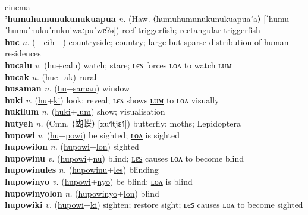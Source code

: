 cinema \label{humocakilyot} \\
\textbf{'humuhumunukunukuapua} \textit{n.} (Haw. ⟨humuhumunukunukuapuaʻa⟩ [ˈhumuˈhumuˈnukuˈnukuˈwaːpuˈwɐʔə])
reef triggerfish; rectangular triggerfish \label{'humuhumunukunukuapua} \\
\textbf{huc} \textit{n.} (\hyperref[cih]{~~cih~~})
countryside; country; large but sparse distribution of human residences \label{huc} \\
\textbf{hucalu} \textit{v.} (\hyperref[hu]{hu}+\hyperref[calu]{calu})
watch; stare; ʟєꜱ forces ʟᴏᴧ to watch ʟᴜᴍ \label{hucalu} \\
\textbf{hucak} \textit{n.} (\hyperref[huc]{huc}+\hyperref[ak]{ak})
rural \label{hucak} \\
\textbf{husaman} \textit{n.} (\hyperref[hu]{hu}+\hyperref[saman]{saman})
window \label{husaman} \\
\textbf{huki} \textit{v.} (\hyperref[hu]{hu}+\hyperref[ki]{ki})
look; reveal; ʟєꜱ shows \hyperref[hukilum]{ʟᴜᴍ} to ʟᴏᴧ visually \label{huki} \\
\textbf{hukilum} \textit{n.} (\hyperref[huki]{huki}+\hyperref[lum]{lum})
show; visualisation \label{hukilum} \\
\textbf{hutyeh} \textit{n.} (Cmn. ⟨蝴蝶⟩ [xu˧˥tjɛ˧˥])
butterfly; moths; Lepidoptera \label{hutyeh} \\
\textbf{hupowi} \textit{v.} (\hyperref[hu]{hu}+\hyperref[powi]{powi})
be sighted; \hyperref[hupowilon]{ʟᴏᴧ} is sighted \label{hupowi} \\
\textbf{hupowilon} \textit{n.} (\hyperref[hupowi]{hupowi}+\hyperref[lon]{lon})
sighted \label{hupowilon} \\
\textbf{hupowinu} \textit{v.} (\hyperref[hupowi]{hupowi}+\hyperref[nu]{nu})
blind; \hyperref[hupowinules]{ʟєꜱ} causes ʟᴏᴧ to become blind \label{hupowinu} \\
\textbf{hupowinules} \textit{n.} (\hyperref[hupowinu]{hupowinu}+\hyperref[les]{les})
blinding \label{hupowinules} \\
\textbf{hupowinyo} \textit{v.} (\hyperref[hupowi]{hupowi}+\hyperref[nyo]{nyo})
be blind; \hyperref[hupowinyolon]{ʟᴏᴧ} is blind \label{hupowinyo} \\
\textbf{hupowinyolon} \textit{n.} (\hyperref[hupowinyo]{hupowinyo}+\hyperref[lon]{lon})
blind \label{hupowinyolon} \\
\textbf{hupowiki} \textit{v.} (\hyperref[hupowi]{hupowi}+\hyperref[ki]{ki})
sighten; restore sight; ʟєꜱ causes ʟᴏᴧ to become sighted \label{hupowiki} \\
